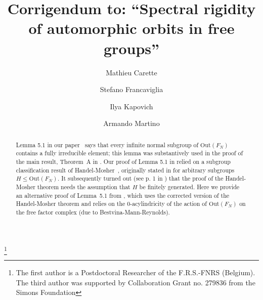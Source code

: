 \documentclass[10pt]{amsart}
\newcommand\<{\langle}
\renewcommand\>{\rangle}
\newcommand{\Out}{\mbox{Out}}
\theoremstyle{definition}
\begin{document}
\title{Corrigendum to: ``Spectral rigidity of automorphic orbits in free groups''}


\author{Mathieu Carette}
\address{\tt SST/IRMP, 
Chemin du Cyclotron 2, bte L7.01.01, 
1348 Louvain-la-Neuve,
Belgium}

\author{Stefano Francaviglia}

\address{\tt Dipartimento di Matematica of the University of Bologna, 
Pizza Porta S. Donato 5, 40126 Bologna, Italy}


\author{Ilya Kapovich}
\address{\tt Department of Mathematics, University of Illinois at
 Urbana-Champaign, 1409 West Green Street, Urbana, IL 61801, USA
 \newline http://www.math.uiuc.edu/\~{}kapovich/} 

\author{Armando Martino}
\address{\tt School of Mathematics,
University of Southampton;
Highfield, Southampton,
SO17 1BJ, United Kingdom }





	
\begin{abstract}
Lemma 5.1 in our paper~\cite{CFKM} says that every infinite normal subgroup of $\Out(F_N)$ contains a fully irreducible element; this lemma was substantively used
in the proof of the main result, Theorem~A in \cite{CFKM}.
Our proof of Lemma 5.1 in \cite{CFKM} relied on a subgroup classification result of
Handel-Mosher~\cite{HM}, originally stated in \cite{HM} for arbitrary
subgroups $H\le \Out(F_N)$. It subsequently turned out (see p. 1 in \cite{HM1}) that the proof
of the Handel-Mosher theorem needs the assumption that $H$ be finitely
generated. Here we provide an alternative proof of Lemma~5.1 from
\cite{CFKM}, which uses the corrected version of the Handel-Mosher
theorem and relies on the 0-acylindricity of the action of $\Out(F_N)$
on the free factor complex (due to Bestvina-Mann-Reynolds).
\end{abstract}
	

\thanks{The first author is a Postdoctoral Researcher of the F.R.S.-FNRS (Belgium). The third author was supported by Collaboration Grant no. 279836 from the Simons Foundation}


	
	
	
\maketitle
\end{document}
